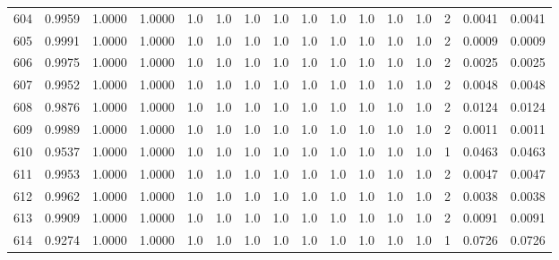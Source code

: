 \begin{tabular}{lrrrrrrrrrrrrrrr}
604 &      0.9959 &  1.0000 &  1.0000 &     1.0 &     1.0 &     1.0 &     1.0 &     1.0 &     1.0 &     1.0 &      1.0 &        1.0 &      2 &                    0.0041 &                     0.0041 \\
605 &      0.9991 &  1.0000 &  1.0000 &     1.0 &     1.0 &     1.0 &     1.0 &     1.0 &     1.0 &     1.0 &      1.0 &        1.0 &      2 &                    0.0009 &                     0.0009 \\
606 &      0.9975 &  1.0000 &  1.0000 &     1.0 &     1.0 &     1.0 &     1.0 &     1.0 &     1.0 &     1.0 &      1.0 &        1.0 &      2 &                    0.0025 &                     0.0025 \\
607 &      0.9952 &  1.0000 &  1.0000 &     1.0 &     1.0 &     1.0 &     1.0 &     1.0 &     1.0 &     1.0 &      1.0 &        1.0 &      2 &                    0.0048 &                     0.0048 \\
608 &      0.9876 &  1.0000 &  1.0000 &     1.0 &     1.0 &     1.0 &     1.0 &     1.0 &     1.0 &     1.0 &      1.0 &        1.0 &      2 &                    0.0124 &                     0.0124 \\
609 &      0.9989 &  1.0000 &  1.0000 &     1.0 &     1.0 &     1.0 &     1.0 &     1.0 &     1.0 &     1.0 &      1.0 &        1.0 &      2 &                    0.0011 &                     0.0011 \\
610 &      0.9537 &  1.0000 &  1.0000 &     1.0 &     1.0 &     1.0 &     1.0 &     1.0 &     1.0 &     1.0 &      1.0 &        1.0 &      1 &                    0.0463 &                     0.0463 \\
611 &      0.9953 &  1.0000 &  1.0000 &     1.0 &     1.0 &     1.0 &     1.0 &     1.0 &     1.0 &     1.0 &      1.0 &        1.0 &      2 &                    0.0047 &                     0.0047 \\
612 &      0.9962 &  1.0000 &  1.0000 &     1.0 &     1.0 &     1.0 &     1.0 &     1.0 &     1.0 &     1.0 &      1.0 &        1.0 &      2 &                    0.0038 &                     0.0038 \\
613 &      0.9909 &  1.0000 &  1.0000 &     1.0 &     1.0 &     1.0 &     1.0 &     1.0 &     1.0 &     1.0 &      1.0 &        1.0 &      2 &                    0.0091 &                     0.0091 \\
614 &      0.9274 &  1.0000 &  1.0000 &     1.0 &     1.0 &     1.0 &     1.0 &     1.0 &     1.0 &     1.0 &      1.0 &        1.0 &      1 &                    0.0726 &                     0.0726 \\

\end{tabular}

